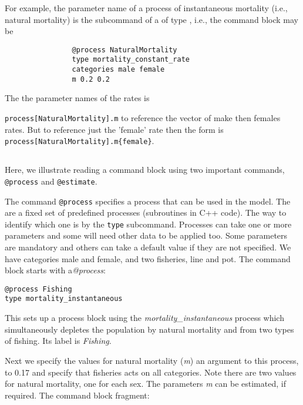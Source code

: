 For example, the parameter name of a process of instantaneous mortality (i.e., natural mortality) is the subcommand  of a  of type , i.e., the command block may be

\small{\begin{verbatim}
				@process NaturalMortality
				type mortality_constant_rate
				categories male female
				m 0.2 0.2
\end{verbatim}}

The the parameter names of the rates is

\texttt{process[NaturalMortality].m} to reference the vector of make then females rates. But to reference just the 'female' rate then the form is
\texttt{process[NaturalMortality].m\{female\}}.

\subsection{\label{sec:Readingcommandblock}}

Here, we illustrate reading a command block using two important commands, \texttt{@process} and \texttt{@estimate}.

The command \texttt{@process} specifies a process that can be used in the model. The are a fixed set of predefined processes (subroutines in C++ code). The way to identify which one is by the \texttt{type} subcommand. Processes can take one or more parameters and some will need other data to be applied too. Some parameters are mandatory and others can take a default value if they are not specified.
We have categories male and female, and two fisheries, line and pot. The command block starts with a\textit{@process}:

{\small{\begin{verbatim}
@process Fishing
type mortality_instantaneous
\end{verbatim}}}

This sets up a process block using the \textit{mortality\_instantaneous} process which simultaneously depletes the population by natural mortality and from two types of fishing. Its label is \textit{Fishing}.

Next we specify the values for natural mortality (\textit{m}) an argument to this process, to 0.17 and specify that fisheries acts on all categories. Note there are two values for natural mortality, one for each sex. The parameters \textit{m} can be estimated, if required. The command block fragment:

